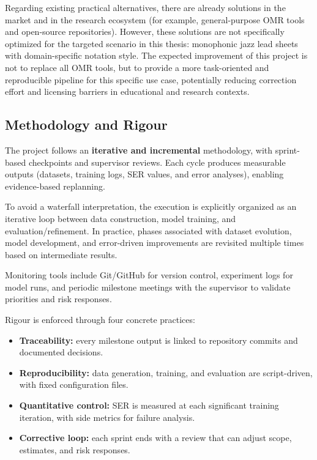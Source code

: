 \documentclass[11pt, a4paper]{article}
\begin{document}
Regarding existing practical alternatives, there are already solutions in the market and in the research ecosystem (for example, general-purpose OMR tools and open-source repositories). However, these solutions are not specifically optimized for the targeted scenario in this thesis: monophonic jazz lead sheets with domain-specific notation style. The expected improvement of this project is not to replace all OMR tools, but to provide a more task-oriented and reproducible pipeline for this specific use case, potentially reducing correction effort and licensing barriers in educational and research contexts.

\subsection{Methodology and Rigour}
The project follows an \textbf{iterative and incremental} methodology, with sprint-based checkpoints and supervisor reviews. Each cycle produces measurable outputs (datasets, training logs, SER values, and error analyses), enabling evidence-based replanning.

To avoid a waterfall interpretation, the execution is explicitly organized as an iterative loop between data construction, model training, and evaluation/refinement. In practice, phases associated with dataset evolution, model development, and error-driven improvements are revisited multiple times based on intermediate results.

Monitoring tools include Git/GitHub for version control, experiment logs for model runs, and periodic milestone meetings with the supervisor to validate priorities and risk responses.

Rigour is enforced through four concrete practices:
\begin{itemize}
    \item \textbf{Traceability:} every milestone output is linked to repository commits and documented decisions.
    \item \textbf{Reproducibility:} data generation, training, and evaluation are script-driven, with fixed configuration files.
    \item \textbf{Quantitative control:} SER is measured at each significant training iteration, with side metrics for failure analysis.
    \item \textbf{Corrective loop:} each sprint ends with a review that can adjust scope, estimates, and risk responses.
\end{itemize}
\end{document}
